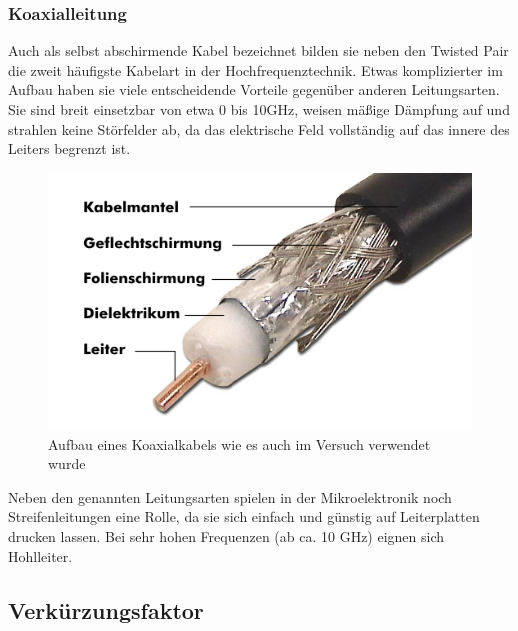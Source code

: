
	\subsubsection{Koaxialleitung} %
	\label{ssub:koaxialleitung}
	
		Auch als selbst abschirmende Kabel bezeichnet bilden sie neben den Twisted Pair die zweit häufigste Kabelart in der Hochfrequenztechnik. 
		Etwas komplizierter im Aufbau haben sie viele entscheidende Vorteile gegenüber anderen Leitungsarten. 
		Sie sind breit einsetzbar von etwa 0 bis 10GHz, weisen mäßige Dämpfung auf und strahlen keine Störfelder ab, da das elektrische Feld vollständig auf das innere des Leiters begrenzt ist.

		\begin{figure}[H]
			\center
			\includegraphics[scale = 0.6]{messwerte/Koaxkabelbild.png}
			\caption{\centering Aufbau eines Koaxialkabels wie es auch im Versuch verwendet wurde \cite{koax}} %
			\label{Koaxkabelbild}	
		\end{figure}

		Neben den genannten Leitungsarten spielen in der Mikroelektronik noch Streifenleitungen eine Rolle, da sie sich einfach und günstig auf Leiterplatten drucken lassen. 
		Bei sehr hohen Frequenzen (ab ca. 10 GHz) eignen sich Hohlleiter.\cite{unterlagen}



\subsection{Verkürzungsfaktor} %
\label{sub:verk_rzungsfaktor}

